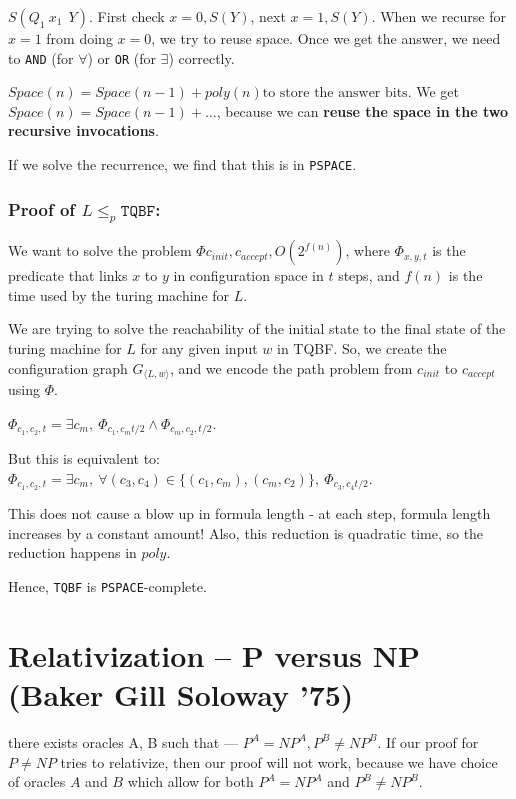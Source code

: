 $S(Q_1~x_1~~Y)$. First check $x = 0, S(Y)$, next $x = 1, S(Y)$.
When we recurse for $x = 1$ from doing $x = 0$, we try to reuse space.
Once we get the answer, we need to \texttt{AND} (for $\forall$)
or \texttt{OR} (for $\exists$) correctly.

$Space(n) = Space(n - 1) + poly(n) \text{to store the answer bits}$.
We get $Space(n) = Space(n - 1) + \dots$, because we can 
\textbf{reuse the space in the two recursive invocations}.

If we solve the recurrence, we find that this is in \texttt{PSPACE}.

\subsubsection{Proof of $L \leq_p \texttt{TQBF}$:}
We want to solve the problem $\Phi{c_{init}, c_{accept}, O(2^{f(n)})}$, where
$\Phi_{x, y, t}$ is the predicate that links $x$ to $y$ in configuration space in
$t$ steps, and $f(n)$ is the time used by the turing machine for $L$.

We are trying to solve the reachability of the initial state to the final state
of the turing machine for $L$ for any given input $w$ in TQBF. So, we 
create the configuration graph $G_{\langle L, w \rangle}$, and we encode the
path problem from $c_{init}$ to $c_{accept}$ using $\Phi$.

$\Phi_{c_1, c_2, t} = \exists c_m, ~\Phi_{c_1, c_m t/2} \land \Phi_{c_m, c_2, t/2}$.

But this is equivalent to:
$\Phi_{c_1, c_2, t} = \exists c_m, ~\forall (c_3, c_4) \in \{ (c_1, c_m), (c_m, c_2) \},~\Phi_{c_3, c_4 t/2}$.

This does not cause a blow up in formula length - at each step, formula
length increases by a constant amount! Also, this reduction is
quadratic time, so the reduction happens in $poly$.

Hence, \texttt{TQBF} is \texttt{PSPACE}-complete.

\section{Relativization -- P versus NP (Baker Gill Soloway '75)}

there exists oracles A,  B such that --- $P^A = {NP}^A, P^B \neq {NP}^B$.
If our proof for $P \neq NP$ tries to relativize, then
our proof will not work, because we have choice of oracles $A$ and $B$ which
allow for both $P^A = {NP}^A$ and $P^B \neq {NP}^B$.

